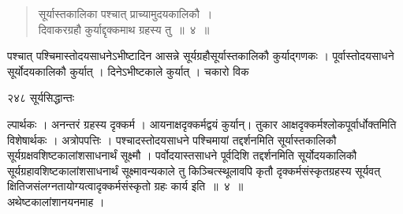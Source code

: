 \documentclass[11pt, openany]{book}
\begin{document}

\begin{quote}
{\ssi सूर्यास्तकालिका पश्चात् प्राच्यामुदयकालिकौ~।\\
दिवाकरग्रहौ कुर्याद्दृक्कमाथ ग्रहस्य तु~॥~४~॥ }
\end{quote}
 पश्चात् पश्चिमास्तोदयसाधनेऽभीष्टादिन आसन्ने सूर्यग्रहौसूर्यास्तकालिकौ कुर्याद्गणकः । पूर्वास्तोदयसाधने सूर्योदयकालिकौ कुर्यात् । दिनेऽभीष्टकाले कुर्यात् । चकारो विक \textendash


\newpage

\noindent २४८ \hspace{4cm} सूर्यसिद्धान्तः 
\vspace{1cm}


\noindent ल्पार्थकः । अनन्तरं ग्रहस्य दृक्कर्म । आयनाक्षदृक्कर्मद्वयं कुर्यान्। तुकार आक्षदृक्कर्मश्लोकपूर्वार्धोक्तमिति विशेषार्थकः । अत्रोपपत्तिः । पश्चादस्तोदयसाधने पश्चिमायां तद्दर्शनमिति सूर्यास्तकालिकौ सूर्यग्रक्षवशिष्टकालांशसाधनार्थं सूक्ष्मौ । पर्वोदयास्तसाधने पूर्वदिशि तद्दर्शनमिति सूर्योदयकालिकौ सूर्यग्रहावशिष्टकालांशसाधनार्थं सूक्ष्मावन्यकाले तु किञ्चित्स्थूलावपि कृतौ दृक्कर्मसंस्कृतग्रहस्य सूर्यवत् क्षितिजसंलग्नतायोग्यत्वादृक्कर्मसंस्कृतो ग्रहः कार्य इति~॥~४~॥ \\ 
\noindent अथेष्टकालांशानयनमाह । 

\end{document}
